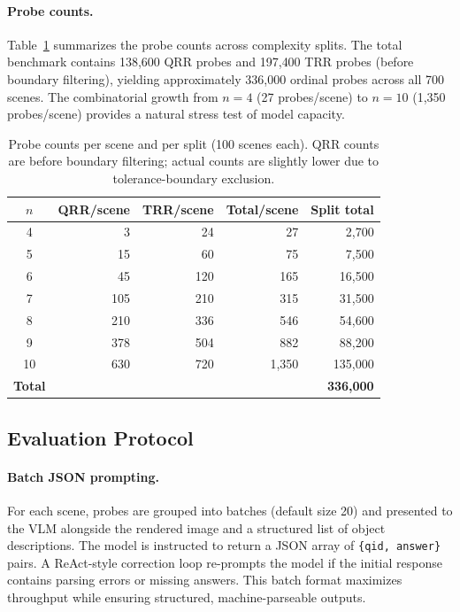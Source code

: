 \paragraph{Probe counts.}
Table~\ref{tab:probe-counts} summarizes the probe counts across complexity splits. The total benchmark contains 138{,}600 QRR probes and 197{,}400 TRR probes (before boundary filtering), yielding approximately 336{,}000 ordinal probes across all 700 scenes. The combinatorial growth from $n{=}4$ (27 probes/scene) to $n{=}10$ (1{,}350 probes/scene) provides a natural stress test of model capacity.

\begin{table}[t]
\centering
\small
\caption{Probe counts per scene and per split (100 scenes each). QRR counts are before boundary filtering; actual counts are slightly lower due to tolerance-boundary exclusion.}
\label{tab:probe-counts}
\begin{tabular}{c r r r r}
\toprule
$n$ & QRR/scene & TRR/scene & Total/scene & Split total \\
\midrule
4  &     3 &    24 &      27 &     2{,}700 \\
5  &    15 &    60 &      75 &     7{,}500 \\
6  &    45 &   120 &     165 &    16{,}500 \\
7  &   105 &   210 &     315 &    31{,}500 \\
8  &   210 &   336 &     546 &    54{,}600 \\
9  &   378 &   504 &     882 &    88{,}200 \\
10 &   630 &   720 &   1{,}350 &   135{,}000 \\
\midrule
\textbf{Total} & \multicolumn{3}{r}{} & \textbf{336{,}000} \\
\bottomrule
\end{tabular}
\end{table}

\subsection{Evaluation Protocol}
\label{sec:protocol}

\paragraph{Batch JSON prompting.}
For each scene, probes are grouped into batches (default size 20) and presented to the VLM alongside the rendered image and a structured list of object descriptions. The model is instructed to return a JSON array of \texttt{\{qid, answer\}} pairs. A ReAct-style correction loop re-prompts the model if the initial response contains parsing errors or missing answers. This batch format maximizes throughput while ensuring structured, machine-parseable outputs.

